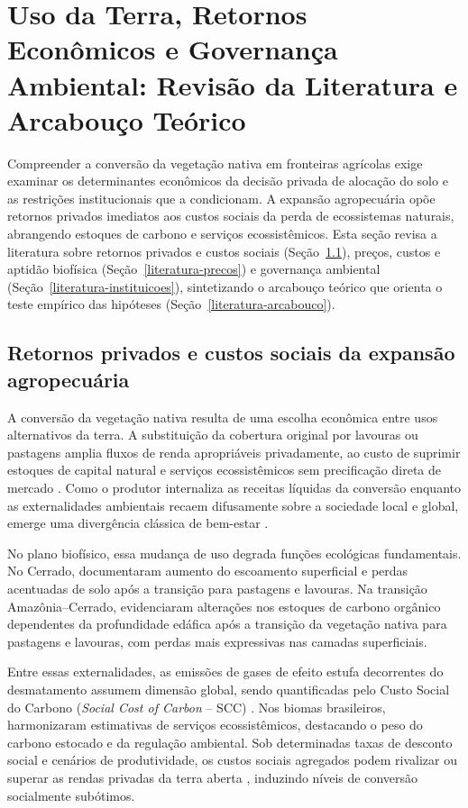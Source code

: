 \section{Uso da Terra, Retornos Econômicos e Governança Ambiental: Revisão da Literatura e Arcabouço Teórico}
\label{sec:literatura}

Compreender a conversão da vegetação nativa em fronteiras agrícolas exige examinar os determinantes econômicos da decisão privada de alocação do solo e as restrições institucionais que a condicionam. A expansão agropecuária opõe retornos privados imediatos aos custos sociais da perda de ecossistemas naturais, abrangendo estoques de carbono e serviços ecossistêmicos. Esta seção revisa a literatura sobre retornos privados e custos sociais (Seção~\ref{literatura-retornos}), preços, custos e aptidão biofísica (Seção~\ref{literatura-precos}) e governança ambiental (Seção~\ref{literatura-instituicoes}), sintetizando o arcabouço teórico que orienta o teste empírico das hipóteses (Seção~\ref{literatura-arcabouco}).

\subsection{Retornos privados e custos sociais da expansão agropecuária}
\label{literatura-retornos}

A conversão da vegetação nativa resulta de uma escolha econômica entre usos alternativos da terra. A substituição da cobertura original por lavouras ou pastagens amplia fluxos de renda apropriáveis privadamente, ao custo de suprimir estoques de capital natural e serviços ecossistêmicos sem precificação direta de mercado \cite{Angelsen2010}. Como o produtor internaliza as receitas líquidas da conversão enquanto as externalidades ambientais recaem difusamente sobre a sociedade local e global, emerge uma divergência clássica de bem-estar \cite{LubowskiEtAl2008, Mann2012}.

No plano biofísico, essa mudança de uso degrada funções ecológicas fundamentais. No Cerrado,  documentaram aumento do escoamento superficial e perdas acentuadas de solo após a transição para pastagens e lavouras. Na transição Amazônia--Cerrado,  evidenciaram alterações nos estoques de carbono orgânico dependentes da profundidade edáfica após a transição da vegetação nativa para pastagens e lavouras, com perdas mais expressivas nas camadas superficiais.

Entre essas externalidades, as emissões de gases de efeito estufa decorrentes do desmatamento assumem dimensão global, sendo quantificadas pelo Custo Social do Carbono (\textit{Social Cost of Carbon} -- SCC) \cite{Nordhaus2017}. Nos biomas brasileiros,  harmonizaram estimativas de serviços ecossistêmicos, destacando o peso do carbono estocado e da regulação ambiental. Sob determinadas taxas de desconto social e cenários de produtividade, os custos sociais agregados podem rivalizar ou superar as rendas privadas da terra aberta \cite{Mann2012}, induzindo níveis de conversão socialmente subótimos.


